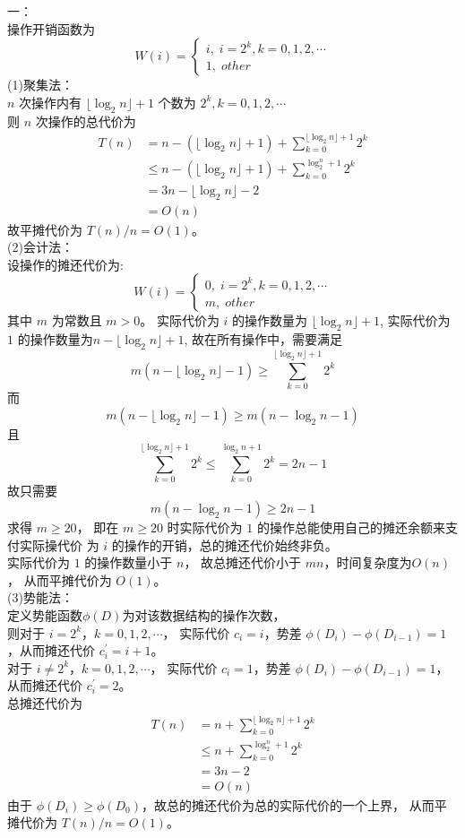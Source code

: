 \documentclass{article}
\begin{document}
一：\\
操作开销函数为
\[
W(i) = 
\begin{cases}
i,\; i = 2^k, k = 0, 1, 2, \cdots \\
1,\; other  
\end{cases}
\]
(1)聚集法：\\
$n$ 次操作内有 $\lfloor{\log_{2}n}\rfloor + 1$ 个数为 
$2^k, k = 0, 1, 2, \cdots$ \\
则 $n$ 次操作的总代价为
\[
\begin{aligned}
T(n) & = n - (\lfloor{\log_{2}n}\rfloor + 1) + \sum\limits_{k = 0}^{\lfloor{\log_{2}n}\rfloor + 1}2^k \\
     & \leq n - (\lfloor{\log_{2}n}\rfloor + 1) + \sum\limits_{k = 0}^{\log_2^n + 1}2^k \\
     & = 3n - \lfloor{\log_{2}n}\rfloor - 2 \\
     & = O(n) 
\end{aligned} 
\]
故平摊代价为 $T(n) / n = O(1)$。\\
(2)会计法：\\
设操作的摊还代价为:
\[
W(i) = 
\begin{cases}
0,\; i = 2^k, k = 0, 1, 2, \cdots \\
m,\; other  
\end{cases}
\]
其中 $m$ 为常数且 $m > 0$。
实际代价为 $i$ 的操作数量为 $\lfloor{\log_{2}n}\rfloor + 1$,
实际代价为 $1$ 的操作数量为$n - \lfloor{\log_{2}n}\rfloor + 1$,
故在所有操作中，需要满足
\[
m(n - \lfloor{\log_{2}n}\rfloor - 1) \geq \sum\limits_{k = 0}^{\lfloor{\log_{2}n}\rfloor + 1}2^k
\]
而
\[
m(n - \lfloor{\log_{2}n}\rfloor - 1) \geq m(n - \log_{2}n - 1)
\]
且
\[
\sum\limits_{k = 0}^{\lfloor{\log_{2}n}\rfloor + 1}2^k \leq \sum\limits_{k = 0}^{\log_{2}n + 1}2^k = 2n - 1
\]
故只需要
\[
m(n - \log_{2}n - 1) \geq 2n - 1
\]
求得 $m \geq 20$，
即在 $m \geq 20$ 时实际代价为 $1$ 的操作总能使用自己的摊还余额来支付实际操代价
为 $i$ 的操作的开销，总的摊还代价始终非负。\\
实际代价为 $1$ 的操作数量小于 $n$， 故总摊还代价小于 $mn$，时间复杂度为$O(n)$，
从而平摊代价为 $O(1)$。\\
(3)势能法：\\
定义势能函数$\phi(D)$为对该数据结构的操作次数，\\
则对于 $i = 2^k， k = 0, 1, 2, \cdots$，
实际代价 $c_i = i$，势差 $\phi(D_i) - \phi(D_{i - 1}) = 1$，从而摊还代价
$c_i^{'} = i + 1$。\\
对于 $i \neq 2^k， k = 0, 1, 2, \cdots$，
实际代价 $c_i = 1$，势差 $\phi(D_i) - \phi(D_{i - 1}) = 1$，从而摊还代价
$c_i^{'} = 2$。\\
总摊还代价为
\[
\begin{aligned}
     T(n) & = n + \sum\limits_{k = 0}^{\lfloor{\log_{2}n}\rfloor + 1}2^k \\
          & \leq n + \sum\limits_{k = 0}^{\log_2^n + 1}2^k \\
          & = 3n - 2 \\
          & = O(n) 
\end{aligned} 
\]
由于 $\phi(D_i) \geq \phi(D_0)$，故总的摊还代价为总的实际代价的一个上界，
从而平摊代价为 $T(n) / n = O(1)$。
\end{document}
